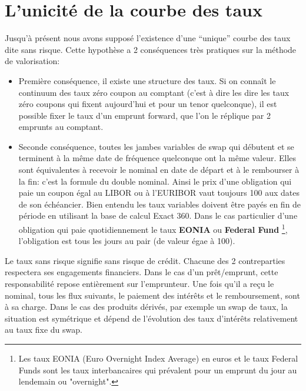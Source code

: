 \documentclass{article}
\begin{document}
\section*{L'unicité de la courbe des taux}

Jusqu’à présent nous avons supposé l’existence d’une “unique” courbe des taux dite sans risque. Cette hypothèse a 2 conséquences très pratiques sur la méthode de valorisation:\\
\begin{itemize}

\item Première conséquence, il existe une structure des taux. Si on connaît le continuum des taux zéro coupon au comptant (c’est à dire les dire les taux zéro coupons qui fixent aujourd’hui et pour un tenor quelconque), il est possible fixer le taux d’un emprunt forward, que l'on le réplique par 2 emprunts au comptant.\\

\item Seconde conséquence, toutes les jambes variables de swap qui débutent et se terminent à la même date de fréquence quelconque ont la même valeur. Elles sont équivalentes à recevoir le nominal en date de départ et à le rembourser à la fin: c’est la formule du double nominal. Ainsi le prix d’une obligation qui paie un coupon égal au LIBOR ou à l'EURIBOR vaut toujours 100 aux dates de son échéancier. Bien entendu les taux variables doivent être payés en fin de période en utilisant la base de calcul Exact 360. Dans le cas particulier d’une obligation qui paie quotidiennement le taux \textbf{EONIA} ou \textbf{Federal Fund} \footnote{Les taux EONIA (Euro Overnight Index Average) en euros et le taux Federal Funds sont les taux interbancaires qui prévalent pour un emprunt du jour au lendemain ou "overnight".}, l’obligation est tous les jours au pair (de valeur égae à 100).\\ 

\end{itemize}

Le taux sans risque signifie sans risque de crédit. Chacune des 2 contreparties respectera ses engagements financiers. Dans le cas d’un prêt/emprunt, cette responsabilité repose entièrement sur l’emprunteur. Une fois qu’il a reçu le nominal, tous les flux suivants, le paiement des intérêts et le remboursement, sont à sa charge. Dans le cas des produits dérivés, par exemple un swap de taux, la situation est symétrique et dépend de l’évolution des taux d’intérêts relativement au taux fixe du swap.\\
\end{document}
